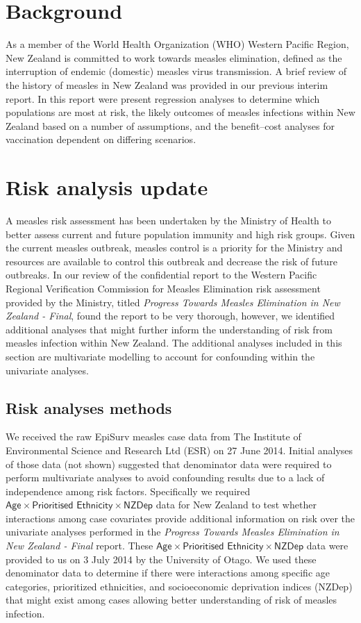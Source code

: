 \documentclass{article}
\begin{document}
\section{Background}

As a member of the World Health Organization (WHO) Western Pacific Region, New Zealand is committed to work towards measles elimination, defined as the interruption of endemic (domestic) measles virus transmission. A brief review of the history of measles in New Zealand was provided in our previous interim report. In this report were present regression analyses to determine which populations are most at risk, the likely outcomes of measles infections within New Zealand based on a number of assumptions, and the benefit--cost analyses for vaccination dependent on differing scenarios. 

\section{Risk analysis update}
\label{sub:risk_analyses}

A measles risk assessment has been undertaken by the Ministry of Health to better assess current and future population immunity and high risk groups. Given the current measles outbreak, measles control is a priority for the Ministry and resources are available to control this outbreak and decrease the risk of future outbreaks. In our review of the confidential report to the Western Pacific Regional Verification Commission for Measles Elimination risk assessment provided by the Ministry, titled \emph {Progress Towards Measles Elimination in New Zealand - Final}, found the report to be very thorough, however, we identified additional analyses that might further inform the understanding of risk from measles infection within New Zealand. The additional analyses included in this section are multivariate modelling to account for confounding within the univariate analyses.

\subsection{Risk analyses methods}
We received the raw EpiSurv measles case data from The Institute of Environmental Science and Research Ltd (ESR) on 27 June 2014. Initial analyses of those data (not shown) suggested that denominator data were required to perform multivariate analyses to avoid confounding results due to a lack of independence among risk factors. Specifically we required $\textsf{Age} \times \textsf{Prioritised Ethnicity} \times \textsf{NZDep}$ data for New Zealand to test whether interactions among case covariates provide additional information on risk over the univariate analyses performed in the \emph{Progress Towards Measles Elimination in New Zealand - Final} report. These $\textsf{Age} \times \textsf{Prioritised Ethnicity} \times \textsf{NZDep}$ data were provided to us on 3 July 2014 by the University of Otago. We used these denominator data to determine if there were interactions among specific age categories, prioritized ethnicities, and socioeconomic deprivation indices (NZDep) that might exist among cases allowing better understanding of risk of measles infection.
\end{document}
